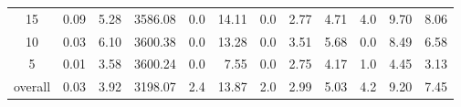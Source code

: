 \begin{table}[H]
\begin{tabular}{c rrrr rr rrr rr}
      15 &           0.09 &        5.28 &    3586.08 &  0.0 &         14.11 &      0.0 &          2.77 &          4.71 &      4.0 &             9.70 &  8.06 \\
      10 &           0.03 &        6.10 &    3600.38 &  0.0 &         13.28 &      0.0 &          3.51 &          5.68 &      0.0 &             8.49 &  6.58 \\
       5 &           0.01 &        3.58 &    3600.24 &  0.0 &          7.55 &      0.0 &          2.75 &          4.17 &      1.0 &             4.45 &  3.13 \\
\midrule
 overall &           0.03 &        3.92 &    3198.07 &  2.4 &         13.87 &      2.0 &          2.99 &          5.03 &      4.2 &             9.20 &  7.45 \\
\bottomrule
\end{tabular}
\end{table}